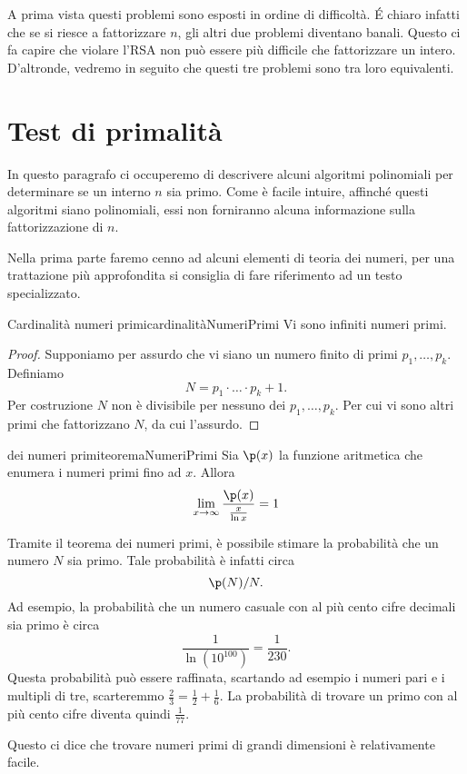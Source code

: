 	A prima vista questi problemi sono esposti in ordine di difficoltà. \'E chiaro infatti che se si riesce a fattorizzare \(n\), gli altri due problemi diventano banali.
	Questo ci fa capire che violare l'RSA non può essere più difficile che fattorizzare un intero.
	D'altronde, vedremo in seguito che questi tre problemi sono tra loro equivalenti.

\section{Test di primalità}

	In questo paragrafo ci occuperemo di descrivere alcuni algoritmi polinomiali per determinare se un interno \(n\) sia primo.
	Come è facile intuire, affinché questi algoritmi siano polinomiali, essi non forniranno alcuna informazione sulla fattorizzazione di \(n\).

	Nella prima parte faremo cenno ad alcuni elementi di teoria dei numeri, per una trattazione più approfondita si consiglia di fare riferimento ad un testo specializzato.

	\begin{teor}{Cardinalità numeri primi}{cardinalitàNumeriPrimi}
	Vi sono infiniti numeri primi.
	\end{teor}

	\begin{proof}
	Supponiamo per assurdo che vi siano un numero finito di primi \(p_1,\ldots,p_k\).
	Definiamo
		\[
		N = p_1 \cdot\ldots\cdot p_k +1.
		\]
	Per costruzione \(N\) non è divisibile per nessuno dei \(p_1,\ldots,p_k\).
	Per cui vi sono altri primi che fattorizzano \(N\), da cui l'assurdo.
	\end{proof}

	\begin{teor}{dei numeri primi}{teoremaNumeriPrimi}
	Sia \(\p(x)\) la funzione aritmetica che enumera i numeri primi fino ad \(x\). Allora
		\[
		\lim_{x \to \infty} \frac{\p(x)}{\frac{x}{\ln x}} = 1
		\]
	\end{teor}

	\begin{oss}
	Tramite il teorema dei numeri primi, è possibile stimare la probabilità che un numero \(N\) sia primo. Tale probabilità è infatti circa
		\[
		\p(N)/N.
		\]
	Ad esempio, la probabilità che un numero casuale con al più cento cifre decimali sia primo è circa
		\[
		\frac{1}{\ln(10^{100})} = \frac{1}{230}.
		\]
	Questa probabilità può essere raffinata, scartando ad esempio i numeri pari e i multipli di tre, scarteremmo \(\frac{2}{3} = \frac{1}{2}+\frac{1}{6}\). La probabilità di trovare un primo con al più cento cifre diventa quindi \(\frac{1}{77}\).

	Questo ci dice che trovare numeri primi di grandi dimensioni è relativamente facile.
	\end{oss}

